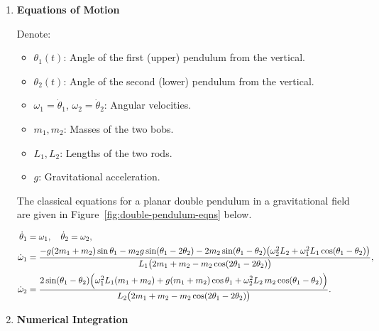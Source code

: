 \documentclass[letterpaper,12pt]{article}
\begin{document}
\begin{enumerate}[leftmargin=*, itemsep=1em]
\item \textbf{Equations of Motion}
\label{sec:equations}

Denote:
\begin{itemize}
    \item $\theta_1(t)$: Angle of the first (upper) pendulum from the vertical.
    \item $\theta_2(t)$: Angle of the second (lower) pendulum from the vertical.
    \item $\omega_1 = \dot{\theta}_1$, $\omega_2 = \dot{\theta}_2$: Angular velocities.
    \item $m_1, m_2$: Masses of the two bobs.
    \item $L_1, L_2$: Lengths of the two rods.
    \item $g$: Gravitational acceleration.
\end{itemize}

The classical equations for a planar double pendulum in a gravitational field are given in
Figure~\ref{fig:double-pendulum-eqns} below.

\begin{figure*}[ht]
\centering
\[
\begin{aligned}
\dot{\theta}_1 &= \omega_1, \quad \dot{\theta}_2 = \omega_2, \\
\dot{\omega}_1 &= \frac{-g(2m_1 + m_2)\sin\theta_1 - m_2 g\sin(\theta_1 - 2\theta_2)
- 2m_2\sin(\theta_1 - \theta_2)\bigl(\omega_2^2 L_2 + \omega_1^2 L_1 \cos(\theta_1 - \theta_2)\bigr)}
{L_1 \bigl(2m_1 + m_2 - m_2 \cos(2\theta_1 - 2\theta_2)\bigr)}, \\
\dot{\omega}_2 &= \frac{2 \sin(\theta_1 - \theta_2)\Bigl(\omega_1^2 L_1 (m_1 + m_2)
+ g (m_1 + m_2)\cos\theta_1
+ \omega_2^2 L_2 \, m_2 \cos(\theta_1 - \theta_2)\Bigr)}
{L_2 \bigl(2m_1 + m_2 - m_2 \cos(2\theta_1 - 2\theta_2)\bigr)}.
\end{aligned}
\]
\caption{Equations of motion for a planar double pendulum.}
\label{fig:double-pendulum-eqns}
\end{figure*}

\item \textbf{Numerical Integration}


\end{enumerate}
\end{document}
